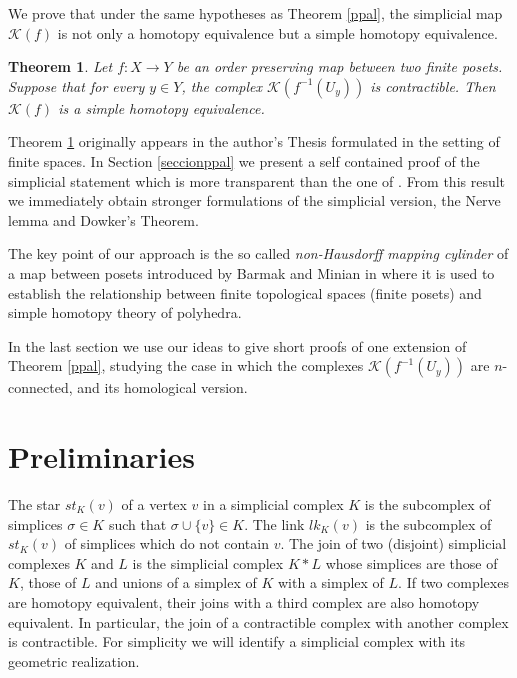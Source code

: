 \documentclass[11pt,twoside]{amsart}
\theoremstyle{plain}
\newtheorem{teo}[lema]{Theorem}
\theoremstyle{remark}
\theoremstyle{definition}
\newcommand{\kp}{\mathcal{K}}
\begin{document}
We prove that under the same hypotheses as Theorem \ref{ppal}, the simplicial map $\kp (f)$ is not only a homotopy equivalence but a simple homotopy equivalence.
  
\begin{teo} \label{ppalprima}
Let $f:X\to Y$ be an order preserving map between two finite posets. Suppose that for every $y\in Y$, the complex $\kp(f^{-1}(U_y))$ is contractible. Then $\kp(f)$ is a simple homotopy equivalence.  
\end{teo}

Theorem \ref{ppalprima} originally appears in the author's Thesis \cite[Proposition 6.2.9]{Bar3} formulated in the setting of finite spaces. In Section \ref{seccionppal} we present a self contained proof of the simplicial statement which is more transparent than the one of \cite{Bar3}.   
From this result we immediately obtain stronger formulations of the simplicial version, the Nerve lemma and Dowker's Theorem. 

The key point of our approach is the so called \textit{non-Hausdorff mapping cylinder} of a map between posets introduced by Barmak and Minian in \cite{BM} where it is used to establish the relationship between finite topological spaces (finite posets) and simple homotopy theory of polyhedra.

In the last section we use our ideas to give short proofs of one extension of Theorem \ref{ppal}, studying the case in which the complexes $\kp (f^{-1}(U_y))$ are $n$-connected, and its homological version. 



\section{Preliminaries}

The star $st_K(v)$ of a vertex $v$ in a simplicial complex $K$ is the subcomplex of simplices $\sigma \in K$ such that $\sigma \cup \{v\} \in K$. The link $lk_K(v)$ is the subcomplex of $st_K(v)$ of simplices which do not contain $v$. The join of two (disjoint) simplicial complexes $K$ and $L$ is the simplicial complex $K*L$ whose simplices are those of $K$, those of $L$ and unions of a simplex of $K$ with a simplex of $L$. If two complexes are homotopy equivalent, their joins with a third complex are also homotopy equivalent. In particular, the join of a contractible complex with another complex is contractible. For simplicity we will identify a simplicial complex with its geometric realization.
\end{document}
